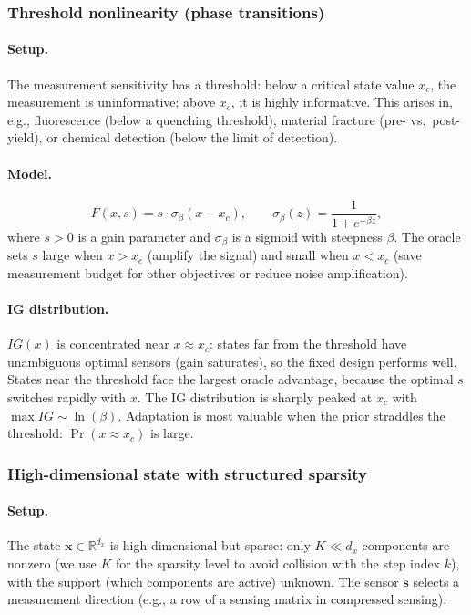 \documentclass[11pt,a4paper]{article}
\newcommand{\R}{\mathbb{R}}
\begin{document}
\subsubsection{Threshold nonlinearity (phase transitions)}

\paragraph{Setup.}
The measurement sensitivity has a threshold: below a critical state value $x_c$, the measurement is uninformative; above $x_c$, it is highly informative.  This arises in, e.g., fluorescence (below a quenching threshold), material fracture (pre- vs.\ post-yield), or chemical detection (below the limit of detection).

\paragraph{Model.}
\begin{equation}
  F(x, s) = s \cdot \sigma_\beta(x - x_c), \qquad \sigma_\beta(z) = \frac{1}{1 + e^{-\beta z}},
\end{equation}
where $s > 0$ is a gain parameter and $\sigma_\beta$ is a sigmoid with steepness $\beta$.  The oracle sets $s$ large when $x > x_c$ (amplify the signal) and small when $x < x_c$ (save measurement budget for other objectives or reduce noise amplification).

\paragraph{IG distribution.}
$IG(x)$ is concentrated near $x \approx x_c$: states far from the threshold have unambiguous optimal sensors (gain saturates), so the fixed design performs well.  States near the threshold face the largest oracle advantage, because the optimal $s$ switches rapidly with $x$.  The IG distribution is sharply peaked at $x_c$ with $\max IG \sim \ln(\beta)$.  Adaptation is most valuable when the prior straddles the threshold: $\Pr(x \approx x_c)$ is large.

\subsubsection{High-dimensional state with structured sparsity}

\paragraph{Setup.}
The state $\bm{x} \in \R^{d_x}$ is high-dimensional but sparse: only $K \ll d_x$ components are nonzero (we use $K$ for the sparsity level to avoid collision with the step index $k$), with the support (which components are active) unknown.  The sensor $\bm{s}$ selects a measurement direction (e.g., a row of a sensing matrix in compressed sensing).
\end{document}
